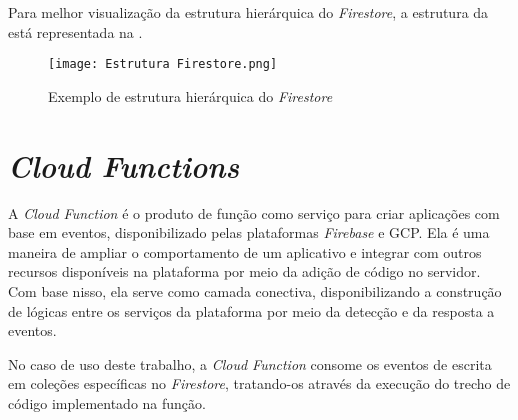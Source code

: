 Para melhor visualização da estrutura hierárquica do \textit{Firestore}, a estrutura da  está representada na .

\begin{figure}[!htb]
    \centering
    \texttt{[image: Estrutura Firestore.png]}
    \caption{Exemplo de estrutura hierárquica do \textit{Firestore}}
    \label{fig:explicacaofirestorecompleto}
\end{figure}

\section{\textit{Cloud Functions}}\label{sec:cloudfunctions}

A \textit{Cloud Function} é o produto de função como serviço para criar aplicações com base em eventos, disponibilizado pelas plataformas \textit{Firebase} e GCP. Ela é uma maneira de ampliar o comportamento de um aplicativo e integrar com outros recursos disponíveis na plataforma por meio da adição de código no servidor. Com base nisso, ela serve como camada conectiva, disponibilizando a construção de lógicas entre os serviços da plataforma por meio da detecção e da resposta a eventos.

No caso de uso deste trabalho, a \textit{Cloud Function} consome os eventos de escrita em coleções específicas no \textit{Firestore}, tratando-os através da execução do trecho de código implementado na função.
